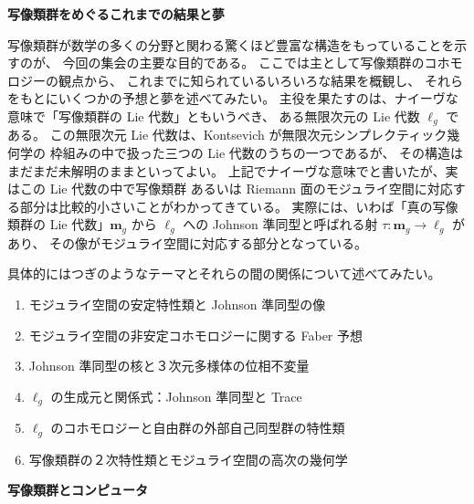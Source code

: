 \documentclass[uplatex,dvipdfmx]{jlreq}
\begin{document}
\newpage

\begin{center}
{\large\bfseries 写像類群をめぐるこれまでの結果と夢}

\hspace*{\fill}{\large\bfseries 森田 茂之（東大・数理）}
\end{center}

\medskip

写像類群が数学の多くの分野と関わる驚くほど豊富な構造をもっていることを示すのが、
今回の集会の主要な目的である。
ここでは主として写像類群のコホモロジーの観点から、
これまでに知られているいろいろな結果を概観し、
それらをもとにいくつかの予想と夢を述べてみたい。
主役を果たすのは、ナイーヴな意味で「写像類群の Lie 代数」ともいうべき、
ある無限次元の Lie 代数 $\ell_g$ である。
この無限次元 Lie 代数は、Kontsevich が無限次元シンプレクティック幾何学の
枠組みの中で扱った三つの Lie 代数のうちの一つであるが、
その構造はまだまだ未解明のままといってよい。
上記でナイーヴな意味でと書いたが、実はこの Lie 代数の中で写像類群
あるいは Riemann 面のモジュライ空間に対応する部分は比較的小さいことがわかってきている。
実際には、いわば「真の写像類群の Lie 代数」$\mathbf{m}_g$ から $\ell_g$ への
Johnson 準同型と呼ばれる射 $\tau : \mathbf{m}_g \to \ell_g$ があり、
その像がモジュライ空間に対応する部分となっている。

具体的にはつぎのようなテーマとそれらの間の関係について述べてみたい。
\begin{enumerate}
  \setlength{\itemsep}{2pt}
  \item モジュライ空間の安定特性類と Johnson 準同型の像
  \item モジュライ空間の非安定コホモロジーに関する Faber 予想
  \item Johnson 準同型の核と３次元多様体の位相不変量
  \item $\ell_g$ の生成元と関係式：Johnson 準同型と Trace
  \item $\ell_g$ のコホモロジーと自由群の外部自己同型群の特性類
  \item 写像類群の２次特性類とモジュライ空間の高次の幾何学
\end{enumerate}

\newpage

\begin{center}
{\large\bfseries 写像類群とコンピュータ}

\hspace*{\fill}{\large\bfseries 阿原 一志（明治大・理工）}
\end{center}
\end{document}
